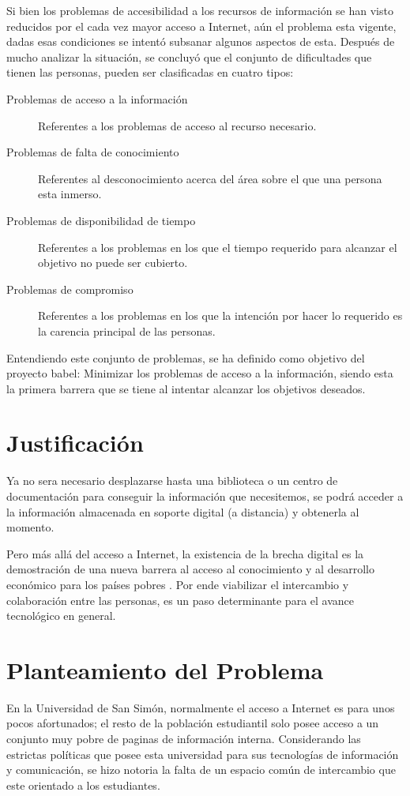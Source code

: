 \documentclass[letter,11pt,oneside,spanish]{article}
\begin{document}
Si bien los problemas de accesibilidad a los recursos de información se han
visto reducidos por el cada vez mayor acceso a Internet, aún el problema esta
vigente, dadas esas condiciones se intentó subsanar algunos aspectos de esta.
Después de mucho analizar la situación, se concluyó que el conjunto de
dificultades que tienen las personas, pueden ser clasificadas en cuatro tipos:

\begin{description}
\item [Problemas de acceso a la información]
    Referentes a los problemas de acceso al recurso necesario.
\item [Problemas de falta de conocimiento]
    Referentes al desconocimiento acerca del área sobre el que una persona esta
    inmerso.
\item [Problemas de disponibilidad de tiempo]
    Referentes a los problemas en los que el tiempo requerido para alcanzar
    el objetivo no puede ser cubierto.
\item [Problemas de compromiso]
    Referentes a los problemas en los que la intención por hacer lo requerido es
    la carencia principal de las personas.
\end{description}

Entendiendo este conjunto de problemas, se ha definido como objetivo del
proyecto babel: Minimizar los problemas de acceso a la información, siendo esta
la primera barrera que se tiene al intentar alcanzar los objetivos deseados.

\section{Justificación}
Ya no sera necesario desplazarse hasta una biblioteca o un centro de
documentación para conseguir la información que necesitemos, se podrá acceder a
la información almacenada en soporte digital (a distancia) y obtenerla al
momento.

Pero más allá del acceso a Internet, la existencia de la brecha digital es la
demostración de una nueva barrera al acceso al conocimiento y al desarrollo
económico para los países pobres \cite{brecha}. Por ende viabilizar el
intercambio y colaboración entre las personas, es un paso determinante para el
avance tecnológico en general.

\section{Planteamiento del Problema}
En la Universidad de San Simón, normalmente el acceso a Internet es para unos
pocos afortunados; el resto de la población estudiantil solo posee acceso a un
conjunto muy pobre de paginas de información interna. Considerando las estrictas
políticas que posee esta universidad para sus tecnologías de información y
comunicación, se hizo notoria la falta de un espacio común de intercambio que
este orientado a los estudiantes.
\end{document}
